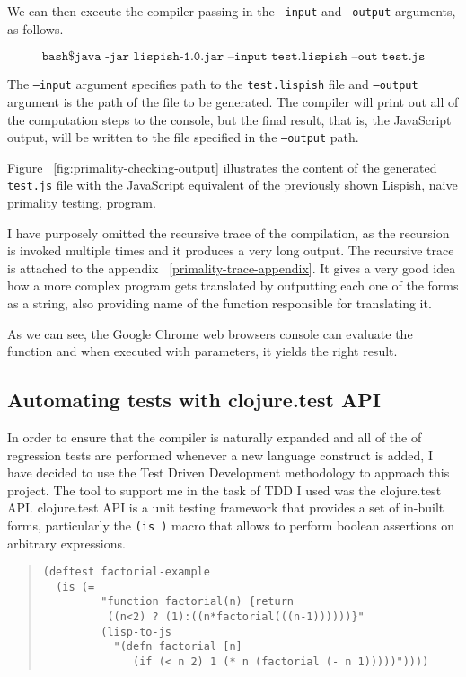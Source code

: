 We can then execute the compiler passing in the \texttt{--input} and \texttt{--output} arguments, as follows.

$$  \texttt{bash\$ java -jar lispish-1.0.jar --input test.lispish --out test.js} $$

The \texttt{--input} argument specifies path to the \texttt{test.lispish} file and \texttt{--output} argument is the path of the file to be generated.
The compiler will print out all of the computation steps to the console, but the final result, that is, the JavaScript output, will be written to the file specified in the \texttt{--output} path.

Figure ~\ref{fig:primality-checking-output} illustrates the content of the generated \texttt{test.js} file with the JavaScript equivalent of the previously shown Lispish, naive primality testing, program. 

I have purposely omitted the recursive trace of the compilation, as the recursion is invoked multiple times and it produces a very long output. 
The recursive trace is attached to the appendix ~\ref{primality-trace-appendix}. It gives a very good idea how a more complex program gets translated by outputting each one of the forms as a string, also providing name of the function responsible for translating it. 

As we can see, the Google Chrome web browsers console can evaluate the function and when executed with parameters, it yields the right result. 

\subsection{Automating tests with clojure.test API}
In order to ensure that the compiler is naturally expanded and all of the of regression tests are performed whenever a new language construct is added, I have decided to use the Test Driven Development methodology to approach this project. 
The tool to support me in the task of TDD I used was the clojure.test API.
clojure.test API\cite{clojure.test:2011:Site} is a unit testing framework that provides a set of in-built forms, particularly the \texttt{(is )} macro that allows to perform boolean assertions on arbitrary expressions. 

\begin{quote}
\begin{verbatim}
(deftest factorial-example
  (is (= 
         "function factorial(n) {return 
          ((n<2) ? (1):((n*factorial(((n-1))))))}"
         (lisp-to-js 
           "(defn factorial [n] 
              (if (< n 2) 1 (* n (factorial (- n 1)))))"))))
\end{verbatim}
\end{quote}

